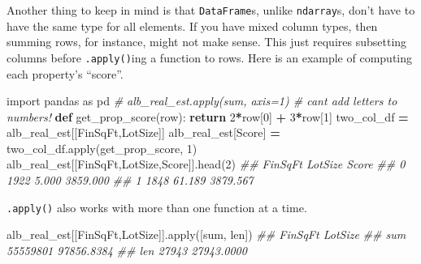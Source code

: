 \documentclass[
  12pt,
  krantz2]{krantz}
\makeatletter
\newenvironment{Shaded}{\begin{snugshade}}{\end{snugshade}}
\newcommand{\BuiltInTok}[1]{#1}
\newcommand{\CommentTok}[1]{\textcolor[rgb]{0.37,0.37,0.37}{\textit{#1}}}
\newcommand{\ControlFlowTok}[1]{\textcolor[rgb]{0.27,0.27,0.27}{\textbf{#1}}}
\newcommand{\DecValTok}[1]{\textcolor[rgb]{0.06,0.06,0.06}{#1}}
\newcommand{\ImportTok}[1]{#1}
\newcommand{\KeywordTok}[1]{\textcolor[rgb]{0.27,0.27,0.27}{\textbf{#1}}}
\newcommand{\NormalTok}[1]{#1}
\newcommand{\OperatorTok}[1]{\textcolor[rgb]{0.43,0.43,0.43}{\textbf{#1}}}
\newcommand{\StringTok}[1]{\textcolor[rgb]{0.5,0.5,0.5}{#1}}
\newenvironment{kframe}{%
\medskip{}
\setlength{\fboxsep}{.8em}
 \def\at@end@of@kframe{}%
 \ifinner\ifhmode%
  \def\at@end@of@kframe{\end{minipage}}%
  \begin{minipage}{\columnwidth}%
 \fi\fi%
 \def\FrameCommand##1{\hskip\@totalleftmargin \hskip-\fboxsep
 \colorbox{shadecolor}{##1}\hskip-\fboxsep
     \hskip-\linewidth \hskip-\@totalleftmargin \hskip\columnwidth}%
 \MakeFramed {\advance\hsize-\width
   \@totalleftmargin\z@ \linewidth\hsize
   \@setminipage}}%
 {\par\unskip\endMakeFramed%
 \at@end@of@kframe}
\renewenvironment{Shaded}{\begin{kframe}}{\end{kframe}}
\makeatother
\begin{document}
Another thing to keep in mind is that \texttt{DataFrame}s, unlike \texttt{ndarray}s, don't have to have the same type for all elements. If you have mixed column types, then summing rows, for instance, might not make sense. This just requires subsetting columns before \texttt{.apply()}ing a function to rows. Here is an example of computing each property's ``score''.

\begin{Shaded}
\begin{Highlighting}[]
\ImportTok{import}\NormalTok{ pandas }\ImportTok{as}\NormalTok{ pd}
\CommentTok{\# alb\_real\_est.apply(sum, axis=1) \# can\textquotesingle{}t add letters to numbers!}
\KeywordTok{def}\NormalTok{ get\_prop\_score(row):}
  \ControlFlowTok{return} \DecValTok{2}\OperatorTok{*}\NormalTok{row[}\DecValTok{0}\NormalTok{] }\OperatorTok{+} \DecValTok{3}\OperatorTok{*}\NormalTok{row[}\DecValTok{1}\NormalTok{]}
\NormalTok{two\_col\_df }\OperatorTok{=}\NormalTok{ alb\_real\_est[[}\StringTok{\textquotesingle{}FinSqFt\textquotesingle{}}\NormalTok{,}\StringTok{\textquotesingle{}LotSize\textquotesingle{}}\NormalTok{]]}
\NormalTok{alb\_real\_est[}\StringTok{\textquotesingle{}Score\textquotesingle{}}\NormalTok{] }\OperatorTok{=}\NormalTok{ two\_col\_df.}\BuiltInTok{apply}\NormalTok{(get\_prop\_score, }\DecValTok{1}\NormalTok{)}
\NormalTok{alb\_real\_est[[}\StringTok{\textquotesingle{}FinSqFt\textquotesingle{}}\NormalTok{,}\StringTok{\textquotesingle{}LotSize\textquotesingle{}}\NormalTok{,}\StringTok{\textquotesingle{}Score\textquotesingle{}}\NormalTok{]].head(}\DecValTok{2}\NormalTok{)}
\CommentTok{\#\#    FinSqFt  LotSize     Score}
\CommentTok{\#\# 0     1922    5.000  3859.000}
\CommentTok{\#\# 1     1848   61.189  3879.567}
\end{Highlighting}
\end{Shaded}

\texttt{.apply()} also works with more than one function at a time.

\begin{Shaded}
\begin{Highlighting}[]
\NormalTok{alb\_real\_est[[}\StringTok{\textquotesingle{}FinSqFt\textquotesingle{}}\NormalTok{,}\StringTok{\textquotesingle{}LotSize\textquotesingle{}}\NormalTok{]].}\BuiltInTok{apply}\NormalTok{([}\BuiltInTok{sum}\NormalTok{, }\BuiltInTok{len}\NormalTok{])}
\CommentTok{\#\#       FinSqFt     LotSize}
\CommentTok{\#\# sum  55559801  97856.8384}
\CommentTok{\#\# len     27943  27943.0000}
\end{Highlighting}
\end{Shaded}
\end{document}
